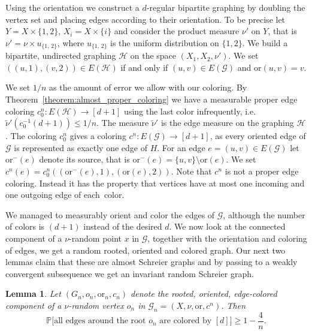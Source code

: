 \documentclass[11pt]{article}
\newtheorem{lemm}[theo]{Lemma}
\theoremstyle{definition}
\numberwithin{equation}{section}
\numberwithin{figure}{section}
\numberwithin{table}{section}
\newcommand{\bbP}{\mathbb{P}}
\newcommand{\G}{\mathcal{G}}
\newcommand{\clH}{\mathcal{H}}
\newcommand{\orl}{\mathrm{or}}
\begin{document}
Using the orientation we construct a $d$-regular bipartite graphing by doubling the vertex set and placing edges according to their orientation. To be precise let $Y=X \times \{1,2\}$, $X_i= X \times \{i\}$ and consider the product measure $\nu'$ on $Y$, that is $\nu' = \nu \times u_{\{1,\,2\}}$, where $u_{\{1,\,2\}}$ is the uniform distribution on $\{1,2\}$. We build a bipartite, undirected graphing $\clH$ on the space $(X_1, X_2, \nu')$. We set $((u,1),(v,2)) \in E(\clH)$ if and only if $(u,v) \in E(\G)$ and $\orl(u,v) = v$.

We set $1/n$ as the amount of error we allow with our coloring. By Theorem~\ref{theorem:almost_proper_coloring} we have a measurable proper edge coloring $c^{n}_0:E(\clH) \to [d+1]$ using the last color infrequently, i.e.\ $\widetilde{\nu}'(c_0^{-1}(d+1))\leq 1/n$. The measure $\widetilde{\nu}'$ is the edge measure on the graphing $\clH$. The coloring $c^n_0$ gives a coloring $c^n: E(\G) \to [d+1]$, as every oriented edge of $\G$ is represented as exactly one edge of $H$. For an edge $e=(u,v) \in E(\G)$ let $\orl^{-}(e)$ denote its source, that is $\orl^{-}(e)=\{u,v\} \setminus \orl(e)$. We set $c^n(e) = c^n_0 ((\orl^{-}(e),1),(\orl(e),2))$. Note that $c^n$ is not a proper edge coloring. Instead it has the property that vertices have at most one incoming and one outgoing edge of each~color.

We managed to measurably orient and color the edges of $\G$, although the number of colors is $(d+1)$ instead of the desired $d$. We now look at the connected component of a $\nu$-random point $x$ in $\G$, together with the orientation and coloring of edges, we get a random rooted, oriented and colored graph. Our next two lemmas claim that these are almost Schreier graphs and by passing to a weakly convergent subsequence we get an invariant random Schreier graph.

\begin{lemm}\label{lemma:almost_schreier}
Let $(G_n,o_n,\orl_n, c_n)$ denote the rooted, oriented, edge-colored component of a $\nu$-random vertex $o_n$ in $\G_n=(X, \nu, \orl, c^n)$. Then
\[
\bbP \big[\text{all edges around the root } o_n \text{ are colored by } [d]\big] \geq 1 - \frac{4}{n}.
\]
\end{lemm}
\end{document}
